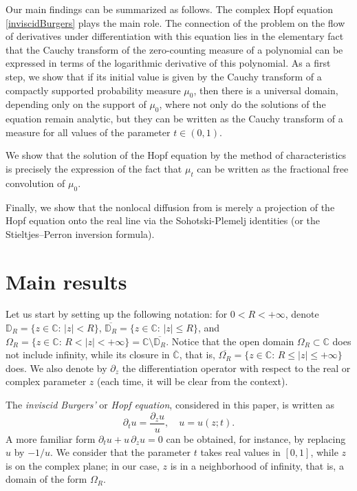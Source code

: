 \documentclass[reqno,11pt]{amsart}
\theoremstyle{plain}
\theoremstyle{definition}
\theoremstyle{remark}
\numberwithin{equation}{section}
\numberwithin{equation}{section}
\newcommand{\C}{\mathbb{C}}
\newcommand{\D}{\mathbb{D}}
\begin{document}
Our main findings can be summarized as follows. The complex Hopf equation \eqref{inviscidBurgers} plays the main role. The connection of the problem on the flow of derivatives under differentiation with this equation lies in the elementary fact that the Cauchy transform of the zero-counting measure of a polynomial can be expressed in terms of the logarithmic derivative of this polynomial. As a first step, we show that if its initial value is given by the Cauchy transform of a compactly supported probability measure $\mu_0$, then there is a universal domain, depending only on the support of $\mu_0$, where not only do the solutions of the equation remain analytic, but they can be written as the Cauchy transform of a measure for all values of the parameter $t\in (0,1)$. 

We show that the solution of the Hopf equation by the method of characteristics is precisely the expression of the fact that $\mu_t$ can be written as the fractional free convolution of $\mu_0$.

Finally, we show that the nonlocal diffusion from \cite{MR4011508} is merely a projection of the Hopf equation onto the real line via the Sohotski-Plemelj identities (or the Stieltjes--Perron inversion formula).

 
\section{Main results}\label{sec:main}

Let us start by setting up the following notation: for $0<R<+\infty$, denote $ \mathbb D_R =\{z\in \C:\, |z|<R\}$, $\overline{ \D_R} =\{z\in \C:\, |z|\le R\}$, and $\Omega_R =\{z\in \C:\, R<|z|<+\infty\}=\C \setminus \overline{ \D_R} $. Notice that the open domain $\Omega_R\subset \C$ does not include infinity, while its closure in $\overline{\C}$, that is, $\overline{\Omega_R}=\{z\in \C:\, R\le|z|\le+\infty\}$ does. We also denote by $\partial_z$ the differentiation operator with respect to the real or complex parameter $z$ (each time, it will be clear from the context).

The \textit{inviscid Burgers'} or  \textit{Hopf equation}, considered in this paper, is written as
\begin{equation} \label{pde}
	\partial_t u = \frac{\partial_z u}{u}, \quad u=u(z;t). 
\end{equation}
A more familiar form $\partial_t u  + u \,\partial_z u =0$ can be obtained, for instance, by replacing $u$ by $-1/u$. We consider that the parameter $t$ takes real values in $[0,1]$, while $z$ is on the complex plane; in our case, $z$ is in a neighborhood of infinity, that is, a domain of the form $\Omega_R$. 
\end{document}
